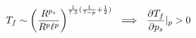 \begin{equation}
T_f \sim \left (\frac{R^{p_s}}{R^p\ell^p} \right )^{\frac{1}{7.5}(\frac{1}{7-p} +
\frac{1}{2}) }\ \ \Longrightarrow  \ \  \frac{\partial T_f}{\partial
p_s} \arrowvert_p > 0
\end{equation}

